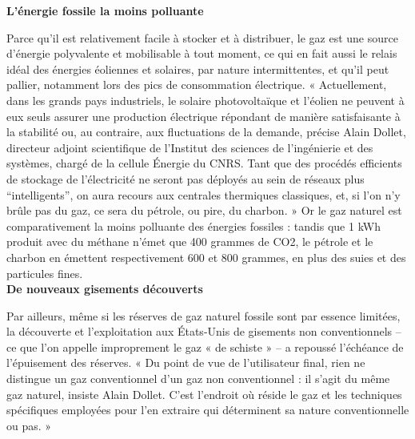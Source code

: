 \documentclass[8pt]{article}
\begin{document}
\textbf{L’énergie fossile la moins polluante}

Parce qu’il est relativement facile à stocker et à distribuer, le gaz est une source d’énergie polyvalente et mobilisable à tout moment, ce qui en fait aussi le relais idéal des énergies éoliennes et solaires, par nature intermittentes, et qu’il peut pallier, notamment lors des pics de consommation électrique. « Actuellement, dans les grands pays industriels, le solaire photovoltaïque et l’éolien ne peuvent à eux seuls assurer une production électrique répondant de manière satisfaisante à la stabilité ou, au contraire, aux fluctuations de la demande, précise Alain Dollet, directeur adjoint scientifique de l’Institut des sciences de l’ingénierie et des systèmes, chargé de la cellule Énergie du CNRS. Tant que des procédés efficients de stockage de l’électricité ne seront pas déployés au sein de réseaux plus “intelligents”, on aura recours aux centrales thermiques classiques, et, si l’on n’y brûle pas du gaz, ce sera du pétrole, ou pire, du charbon. » Or le gaz naturel est compa­rativement la moins polluante des énergies fossiles : tandis que 1 kWh produit avec du méthane n’émet que 400 grammes de CO2, le pétrole et le charbon en émettent respectivement 600 et 800 grammes, en plus des suies et des particules fines. \\

\textbf{De nouveaux gisements découverts}

Par ailleurs, même si les réserves de gaz naturel fossile sont par essence limitées, la découverte et l’exploitation aux États-Unis de gisements non conventionnels – ce que l’on appelle improprement le gaz « de schiste » – a repoussé l’échéance de l’épuisement des réserves. « Du point de vue de l’utilisateur final, rien ne distingue un gaz conventionnel d’un gaz non conventionnel : il s’agit du même gaz naturel, insiste Alain Dollet. C’est l’endroit où réside le gaz et les techniques spécifiques employées pour l’en extraire qui déterminent sa nature conventionnelle ou pas. » \\
\end{document}
